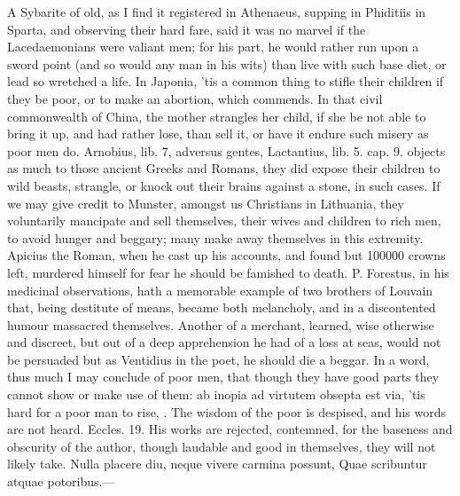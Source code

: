 {{A Sybarite of old, as I find it registered in Athenaeus, supping
in Phiditiis in Sparta, and observing their hard fare, said it was no
marvel if the Lacedaemonians were valiant men; for his part, he would
rather run upon a sword point (and so would any man in his wits) than
live with such base diet, or lead so wretched a life. In Japonia,
'tis a common thing to stifle their children if they be poor, or to
make an abortion, which \Aristotle commends. In that civil commonwealth
of China, the mother strangles her child, if she be not able to
bring it up, and had rather lose, than sell it, or have it endure such
misery as poor men do. Arnobius, lib. 7, adversus gentes,
Lactantius, lib. 5. cap. 9. objects as much to those ancient
Greeks and Romans, they did expose their children to wild beasts,
strangle, or knock out their brains against a stone, in such cases. If
we may give credit to Munster, amongst us Christians in
Lithuania, they voluntarily mancipate and sell themselves, their wives
and children to rich men, to avoid hunger and beggary;  many make
away themselves in this extremity. Apicius the Roman, when he cast up
his accounts, and found but 100\thinspace{}000 crowns left, murdered himself for
fear he should be famished to death. P. Forestus, in his medicinal
observations, hath a memorable example of two brothers of Louvain that,
being destitute of means, became both melancholy, and in a discontented
humour massacred themselves. Another of a merchant, learned, wise
otherwise and discreet, but out of a deep apprehension he had of a loss
at seas, would not be persuaded but as Ventidius in the poet, he
should die a beggar. In a word, thus much I may conclude of poor men,
that though they have good parts they cannot show or make use of
them: ab inopia ad virtutem obsepta est via, 'tis hard for a poor
man to  rise, . The wisdom of the poor is despised, and his words
are not heard. Eccles.  19. His works are rejected, contemned, for
the baseness and obscurity of the author, though laudable and good in
themselves, they will not likely take.
Nulla placere diu, neque vivere carmina possunt,
Quae scribuntur atquae potoribus.---

}}
